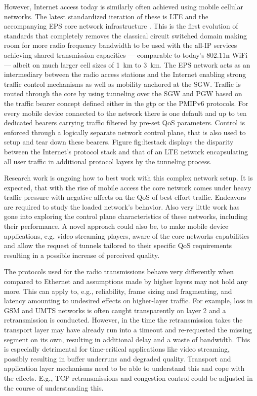 However, Internet access today is similarly often achieved using mobile cellular networks. The latest standardized iteration of these is \gls{LTE} and the accompanying \gls{EPS} core network infrastructure \cite{olsson2009sae}. This is the first evolution of standards that completely removes the classical circuit switched domain making room for more radio frequency bandwidth to be used with the all-\gls{IP} services achieving shared transmission capacities --- comparable to today's 802.11n WiFi --- albeit on much larger cell sizes of \SI{1}{\kilo\meter} to \SI{3}{\kilo\meter}. The \gls{EPS} network acts as an intermediary between the radio access stations and the Internet enabling strong traffic control mechanisms as well as mobility anchored at the \gls{SGW}. Traffic is routed through the core by using tunneling over the \gls{SGW} and \gls{PGW} based on the traffic bearer concept defined either in the \gls{gtp} or the \gls{PMIPv6} protocols. For every mobile device connected to the network there is one default and up to ten dedicated bearers carrying traffic filtered by pre-set \gls{QoS} parameters. Control is enforced through a logically separate network control plane, that is also used to setup and tear down these bearers. Figure fig:ltestack displays the disparity between the Internet's protocol stack and that of an \gls{LTE} network encapsulating all user traffic in additional protocol layers by the tunneling process.

Research work is ongoing how to best work with this complex network setup. It is expected, that with the rise of mobile access the core network comes under heavy traffic pressure with negative affects on the \gls{QoS} of best-effort traffic. Endeavors are required to study the loaded network's behavior. Also very little work has gone into exploring the control plane characteristics of these networks, including their performance. A novel approach could also be, to make mobile device applications, e.g. video streaming players, aware of the core networks capabilities and allow the request of tunnels tailored to their specific \gls{QoS} requirements resulting in a possible increase of perceived quality.


The protocols used for the radio transmissions behave very differently when compared to Ethernet and assumptions made by higher layers may not hold any more. This can apply to, e.g., reliability, frame sizing and fragmenting, and latency amounting to undesired effects on higher-layer traffic. For example, loss in \gls{GSM} and \gls{UMTS} networks is often caught transparently on layer 2 and a retransmission is conducted. However, in the time the retransmission takes the transport layer may have already run into a timeout and re-requested the missing segment on its own, resulting in additional delay and a waste of bandwidth. This is especially detrimental for time-critical applications like video streaming, possibly resulting in buffer underruns and degraded quality. Transport and application layer mechanisms need to be able to understand this and cope with the effects. E.g., \gls{TCP} retransmissions and congestion control could be adjusted in the course of understanding this.

